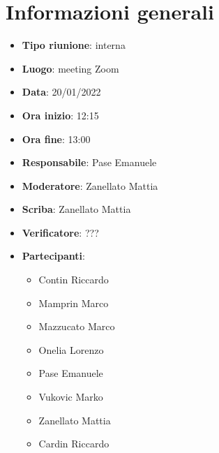 \section{Informazioni generali}
\begin{itemize}
  \item \textbf{Tipo riunione}: interna
  \item \textbf{Luogo}: meeting Zoom
  \item \textbf{Data}: 20/01/2022
  \item \textbf{Ora inizio}: 12:15
  \item \textbf{Ora fine}: 13:00
  \item \textbf{Responsabile}: Pase Emanuele
  \item \textbf{Moderatore}: Zanellato Mattia
  \item \textbf{Scriba}: Zanellato Mattia
  \item \textbf{Verificatore}: ???
  \item \textbf{Partecipanti}:
  \begin{itemize}
    \item Contin Riccardo
    \item Mamprin Marco
    \item Mazzucato Marco
    \item Onelia Lorenzo
    \item Pase Emanuele
    \item Vukovic Marko
    \item Zanellato Mattia
    \item Cardin Riccardo
  \end{itemize}
\end{itemize}
